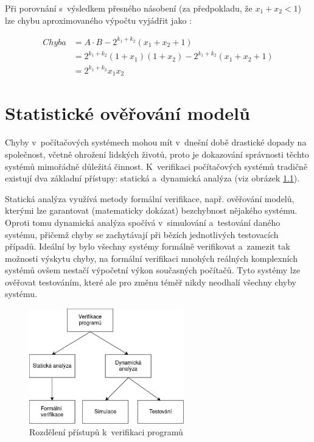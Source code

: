 Při porovnání s~výsledkem přesného násobení (za předpokladu, že $x_1 + x_2 < 1$) lze chybu aproximovaného výpočtu vyjádřit jako \cite{approx_mult_survey}:

\begin{equation}
    \begin{array}{rl}
       Chyba & = A \cdot B - 2^{k_1+k_2}(x_1+x_2+1) \\
             & = 2^{k_1+k_2}(1+x_1)(1+x_2)-2^{k_1+k_2}(x_1+x_2+1) \\
             & = 2^{k_1+k_2}x_1x_2
    \end{array}
\end{equation}

\chapter{Statistické ověřování modelů}
\label{smc}
Chyby v~počítačových systémech mohou mít v~dnešní době drastické dopady na společnost, včetně ohrožení lidských životů, proto je dokazování správnosti těchto systémů mimořádně důležitá činnost. K~verifikaci počítačových systémů tradičně existují dva základní přístupy: statická a~dynamická analýza (viz obrázek \ref{fig:verifikace_rozdeleni}).

Statická analýza využívá metody formální verifikace, např. ověřování modelů, kterými lze garantovat (matematicky dokázat) bezchybnost nějakého systému. Oproti tomu dynamická analýza spočívá v~simulování a~testování daného systému, přičemž chyby se zachytávají při bězích jednotlivých testovacích případů. Ideální by bylo všechny systémy formálně verifikovat a~zamezit tak možnosti výskytu chyby, na formální verifikaci mnohých reálných komplexních systémů ovšem nestačí výpočetní výkon současných počítačů. Tyto systémy lze ověřovat testováním, které ale pro změnu téměř nikdy neodhalí všechny chyby systému.

\begin{figure}[H]
    \centering
    \includegraphics[width=0.6\textwidth]{obrazky-figures/verifikace_rozdeleni.png}
    \caption{Rozdělení přístupů k~verifikaci programů}
    \label{fig:verifikace_rozdeleni}
\end{figure}

